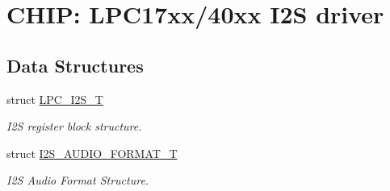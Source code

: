 \hypertarget{group__I2S__17XX__40XX}{\section{C\-H\-I\-P\-: L\-P\-C17xx/40xx I2\-S driver}
\label{group__I2S__17XX__40XX}
}
\subsection*{Data Structures}
\begin{DoxyCompactItemize}
\item 
struct \hyperlink{structLPC__I2S__T}{L\-P\-C\-\_\-\-I2\-S\-\_\-\-T}
\begin{DoxyCompactList}\small\item\em I2\-S register block structure. \end{DoxyCompactList}\item 
struct \hyperlink{structI2S__AUDIO__FORMAT__T}{I2\-S\-\_\-\-A\-U\-D\-I\-O\-\_\-\-F\-O\-R\-M\-A\-T\-\_\-\-T}
\begin{DoxyCompactList}\small\item\em I2\-S Audio Format Structure. \end{DoxyCompactList}\end{DoxyCompactItemize}
